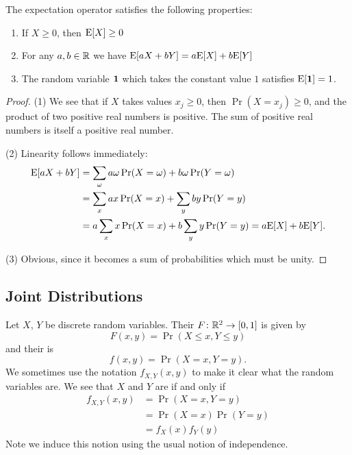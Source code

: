 \begin{thm}
The expectation operator satisfies the following properties:
\begin{enumerate}
\item If $X\geq0$, then $\mathrm{E}[X]\geq0$
\item For any $a,b\in\mathbb{R}$ we have
$\mathrm{E}[aX+bY]=a\mathrm{E}[X]+b\mathrm{E}[Y]$
\item The random variable ${\bf 1}$ which takes the constant value $1$
satisfies $\mathrm{E}[{\bf 1}]=1$.
\end{enumerate}
\end{thm}
\begin{proof}
(1) We see that if $X$ takes values $x_j\geq0$, then $\Pr(X=x_j)\geq0$,
and the product of two positive real numbers is positive. The sum of
positive real numbers is itself a positive real number.

(2) Linearity follows immediately:
\begin{subequations}
\begin{align}
\mathrm{E}[aX+bY] &=\sum_{\omega}a\omega\mathop{\mathrm{Pr}}\nolimits(X=\omega)+b\omega\mathop{\mathrm{Pr}}\nolimits(Y=\omega)\\
&= \sum_{x}ax\mathop{\mathrm{Pr}}\nolimits(X=x) + \sum_{y}by\mathop{\mathrm{Pr}}\nolimits(Y=y)\\
&=a\sum_x x\mathop{\mathrm{Pr}}\nolimits(X=x)+b\sum_y y\mathop{\mathrm{Pr}}\nolimits(Y=y) = a\mathrm{E}[X]+b\mathrm{E}[Y].
\end{align}
\end{subequations}

(3) Obvious, since it becomes a sum of probabilities which must be unity.
\end{proof}

\subsection{Joint Distributions}
Let $X$, $Y$ be discrete random variables. Their  $F\colon\mathbb{R}^{2}\to[0,1]$ is given by
\begin{equation}
F(x,y)=\Pr(X\leq x, Y\leq y)
\end{equation}
and their  is
\begin{equation}
f(x,y) = \Pr(X=x,Y=y).
\end{equation}
We sometimes use the notation $f_{X,Y}(x,y)$ to make it clear what the
random variables are.
We see that $X$ and $Y$ are  if and only if
\begin{subequations}
\begin{align}
f_{X,Y}(x,y)
&= \Pr(X=x,Y=y)\\
&=\Pr(X=x)\Pr(Y=y)\\
&=f_{X}(x)f_{Y}(y)
\end{align}
\end{subequations}
Note we induce this notion using the usual notion of independence.

